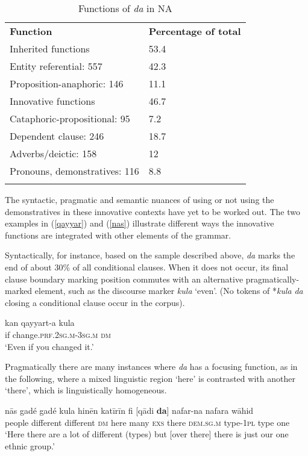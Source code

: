 \documentclass[output=paper]{langsci/langscibook}
\begin{document}
\begin{table}\begin{tabularx}{\textwidth}{XX}
\lsptoprule
\bfseries Function & \bfseries Percentage of total\\
Inherited functions & 53.4\\
        Entity referential: 557 & 42.3\\
        Proposition-anaphoric: 146 & 11.1\\
Innovative functions & 46.7\\
        Cataphoric-propositional: 95 & 7.2\\
        Dependent clause: 246 & 18.7\\
        Adverbs/deictic: 158 & 12\\
        Pronouns, demonstratives: 116 & 8.8\\
\lspbottomrule
\end{tabularx}
\caption{
\label{bkm:Ref520915528}\label{tab:nigeria:}Functions of \textit{da} in NA
}
\label{tab:funct}
\end{table}


The syntactic, pragmatic and semantic nuances of using or not using the demonstratives in these innovative contexts have yet to be worked out. The two examples in (\ref{qayyar}) and (\ref{nas}) illustrate different ways the innovative functions are integrated with other elements of the grammar.

Syntactically, for instance, based on the sample described above, \textit{da} marks the end of about 30\% of all conditional clauses. When it does not occur, its final clause boundary marking position commutes with an alternative pragmatically-marked element, such as the discourse marker \textit{kula} ‘even’. (No tokens of *\textit{kula} \textit{da} closing a conditional clause occur in the corpus).

\ea\label{qayyar} 
\gll kan qayyart-a kula\\
     if change.\textsc{prf.2sg.m-3sg.m} \textsc{dm}\\
\glt ‘Even if you changed it.’
\z

Pragmatically there are many instances where \textit{da} has a focusing function, as in the following, where a mixed linguistic region ‘here’ is contrasted with another ‘there’, which is linguistically homogeneous.

\ea\label{nas}
\gll nās gadé gadé kula hinēn katīrīn fi [qādi \textbf{da}] nafar-na nafara wāhid\\
     people different different \textsc{dm} here many \textsc{exs} there \textsc{dem.sg.m} type-\textsc{1pl} type one\\
\glt ‘Here there are a lot of different (types) but [over there] there is just our one ethnic group.’
\z
\end{document}
